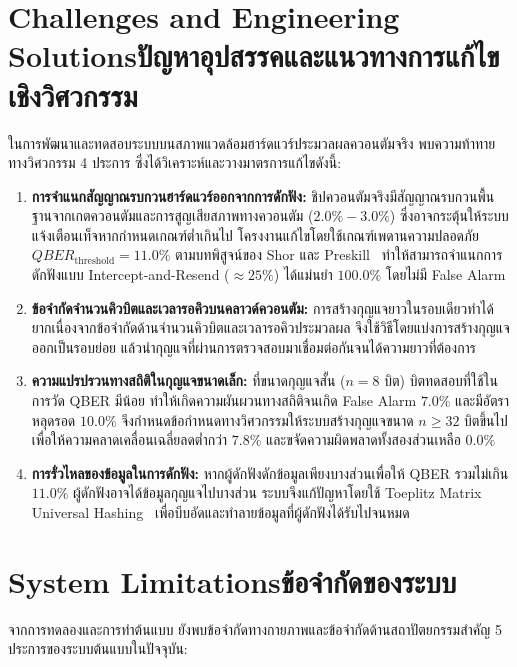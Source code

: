 \section{\ifenglish Challenges and Engineering Solutions\else ปัญหาอุปสรรคและแนวทางการแก้ไขเชิงวิศวกรรม\fi}

ในการพัฒนาและทดสอบระบบบนสภาพแวดล้อมฮาร์ดแวร์ประมวลผลควอนตัมจริง พบความท้าทายทางวิศวกรรม 4 ประการ ซึ่งได้วิเคราะห์และวางมาตรการแก้ไขดังนี้:

\begin{enumerate}
    \item \textbf{การจำแนกสัญญาณรบกวนฮาร์ดแวร์ออกจากการดักฟัง:} ชิปควอนตัมจริงมีสัญญาณรบกวนพื้นฐานจากเกตควอนตัมและการสูญเสียสภาพทางควอนตัม ($2.0\% - 3.0\%$) ซึ่งอาจกระตุ้นให้ระบบแจ้งเตือนเท็จหากกำหนดเกณฑ์ต่ำเกินไป โครงงานแก้ไขโดยใช้เกณฑ์เพดานความปลอดภัย $QBER_{\text{threshold}} = 11.0\%$ ตามบทพิสูจน์ของ Shor และ Preskill~\cite{shor_preskill_2000} ทำให้สามารถจำแนกการดักฟังแบบ Intercept-and-Resend ($\approx 25\%$) ได้แม่นยำ $100.0\%$ โดยไม่มี False Alarm
    
    \item \textbf{ข้อจำกัดจำนวนคิวบิตและเวลารอคิวบนคลาวด์ควอนตัม:} การสร้างกุญแจยาวในรอบเดียวทำได้ยากเนื่องจากข้อจำกัดด้านจำนวนคิวบิตและเวลารอคิวประมวลผล จึงใช้วิธีโดยแบ่งการสร้างกุญแจออกเป็นรอบย่อย แล้วนำกุญแจที่ผ่านการตรวจสอบมาเชื่อมต่อกันจนได้ความยาวที่ต้องการ
    
    \item \textbf{ความแปรปรวนทางสถิติในกุญแจขนาดเล็ก:} ที่ขนาดกุญแจสั้น ($n = 8$ บิต) บิตทดสอบที่ใช้ในการวัด QBER มีน้อย ทำให้เกิดความผันผวนทางสถิติจนเกิด False Alarm $7.0\%$ และมีอัตราหลุดรอด $10.0\%$ จึงกำหนดข้อกำหนดทางวิศวกรรมให้ระบบสร้างกุญแจขนาด $n \ge 32$ บิตขึ้นไป เพื่อให้ความคลาดเคลื่อนเฉลี่ยลดต่ำกว่า $7.8\%$ และขจัดความผิดพลาดทั้งสองส่วนเหลือ $0.0\%$
    
    \item \textbf{การรั่วไหลของข้อมูลในการดักฟัง:} หากผู้ดักฟังดักข้อมูลเพียงบางส่วนเพื่อให้ QBER รวมไม่เกิน $11.0\%$ ผู้ดักฟังอาจได้ข้อมูลกุญแจไปบางส่วน ระบบจึงแก้ปัญหาโดยใช้ Toeplitz Matrix Universal Hashing~\cite{krawczyk_toeplitz, carter_wegman_universal} เพื่อบีบอัดและทำลายข้อมูลที่ผู้ดักฟังได้รับไปจนหมด
\end{enumerate}

\section{\ifenglish System Limitations\else ข้อจำกัดของระบบ\fi}

จากการทดลองและการทำต้นแบบ ยังพบข้อจำกัดทางกายภาพและข้อจำกัดด้านสถาปัตยกรรมสำคัญ 5 ประการของระบบต้นแบบในปัจจุบัน:

